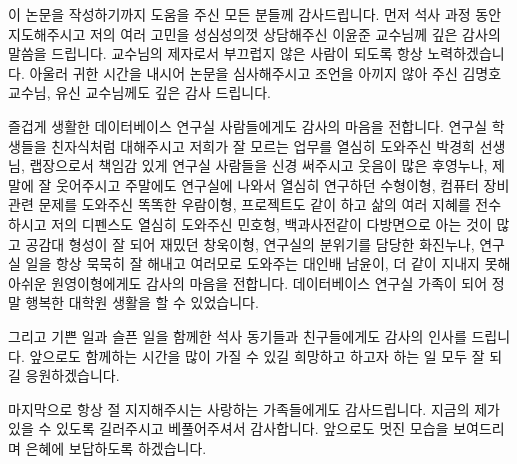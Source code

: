\documentclass[master,english,final]{kaist-ucs}
\begin{document}

\acknowledgment[4]

이 논문을 작성하기까지 도움을 주신 모든 분들께 감사드립니다.
먼저 석사 과정 동안 지도해주시고 저의 여러 고민을 성심성의껏 상담해주신 이윤준 교수님께 깊은 감사의 말씀을 드립니다.
교수님의 제자로서 부끄럽지 않은 사람이 되도록 항상 노력하겠습니다.
아울러 귀한 시간을 내시어 논문을 심사해주시고 조언을 아끼지 않아 주신 김명호 교수님, 유신 교수님께도 깊은 감사 드립니다.

즐겁게 생활한 데이터베이스 연구실 사람들에게도 감사의 마음을 전합니다.
연구실 학생들을 친자식처럼 대해주시고 저희가 잘 모르는 업무를 열심히 도와주신 박경희 선생님,
랩장으로서 책임감 있게 연구실 사람들을 신경 써주시고 웃음이 많은 후영누나,
제 말에 잘 웃어주시고 주말에도 연구실에 나와서 열심히 연구하던 수형이형,
컴퓨터 장비 관련 문제를 도와주신 똑똑한 우람이형,
프로젝트도 같이 하고 삶의 여러 지혜를 전수하시고 저의 디펜스도 열심히 도와주신 민호형,
백과사전같이 다방면으로 아는 것이 많고 공감대 형성이 잘 되어 재밌던 창욱이형,
연구실의 분위기를 담당한 화진누나,
연구실 일을 항상 묵묵히 잘 해내고 여러모로 도와주는 대인배 남윤이,
더 같이 지내지 못해 아쉬운 원영이형에게도 감사의 마음을 전합니다.
데이터베이스 연구실 가족이 되어 정말 행복한 대학원 생활을 할 수 있었습니다.

그리고 기쁜 일과 슬픈 일을 함께한 석사 동기들과 친구들에게도 감사의 인사를 드립니다.
앞으로도 함께하는 시간을 많이 가질 수 있길 희망하고 하고자 하는 일 모두 잘 되길 응원하겠습니다.

마지막으로 항상 절 지지해주시는 사랑하는 가족들에게도 감사드립니다.
지금의 제가 있을 수 있도록 길러주시고 베풀어주셔서 감사합니다.
앞으로도 멋진 모습을 보여드리며 은혜에 보답하도록 하겠습니다.

\curriculumvitae[4]

    \begin{personaldata}
    \end{personaldata}
\end{document}
